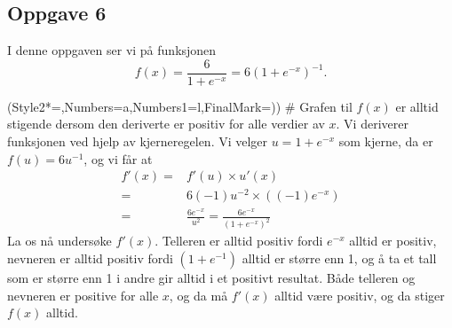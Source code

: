 \subsection*{Oppgave 6}
I denne oppgaven ser vi på funksjonen
\begin{equation*}
	f(x) = \frac{6}{1 + e^{-x}} = 6 \left( 1 + e^{-x} \right)^{-1}.
\end{equation*}
\begin{easylist}[enumerate]
	\ListProperties(Style2*=,Numbers=a,Numbers1=l,FinalMark={)})
	# Grafen til $f(x)$ er alltid stigende dersom den deriverte er positiv for alle verdier av $x$.
	Vi deriverer funksjonen ved hjelp av kjerneregelen. Vi velger $u = 1 + e^{-x}$ som kjerne, da er $f(u) = 6u^{-1}$, og vi får at
	\begin{align*}
		f'(x) =& f'(u) \times u'(x) \\
		=& 6(-1)u^{-2} \times \left((-1) e^{-x}\right) \\
		=& \frac{6e^{-x}}{u^2} = \frac{6e^{-x}}{\left(1 + e^{-x}\right)^2}
	\end{align*}
	La os nå undersøke $f'(x)$.
	Telleren er alltid positiv fordi $e^{-x}$ alltid er positiv, nevneren er alltid positiv fordi $(1 + e^{-1})$ alltid er større enn 1, og å ta et tall som er større enn 1 i andre gir alltid i et positivt resultat.
	Både telleren og nevneren er positive for alle $x$, og da må $f'(x)$ alltid være positiv, og da stiger $f(x)$ alltid.


\end{easylist}
